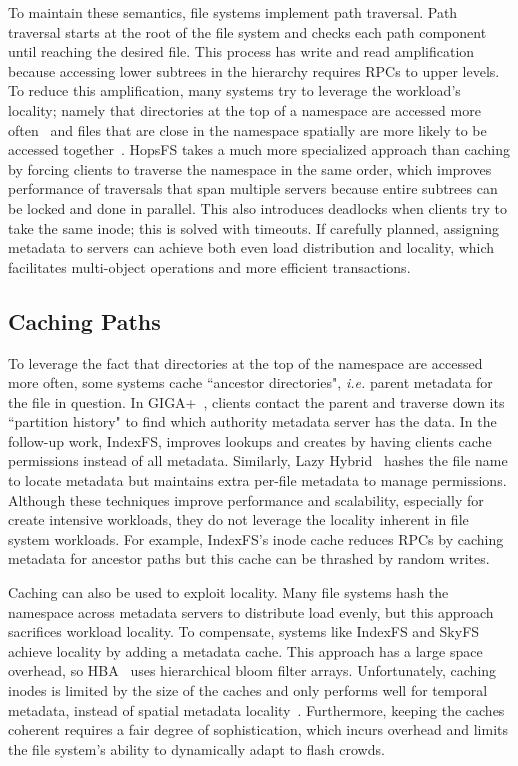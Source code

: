 To maintain these semantics, file systems implement path traversal. Path
traversal starts at the root of the file system and checks each path component
until reaching the desired file. This process has write and read amplification
because accessing lower subtrees in the hierarchy requires RPCs to upper
levels. To reduce this amplification, many systems try to leverage the
workload's locality; namely that directories at the top of a namespace are
accessed more often~\cite{ren:sc2014-indexfs} and files that are close in the
namespace spatially are more likely to be accessed
together~\cite{weil:osdi2006-ceph, weil:sc2004-dyn-metadata}.  HopsFS takes a
much more specialized approach than caching by forcing clients to traverse the
namespace in the same order, which improves performance of traversals that span
multiple servers because entire subtrees can be locked and done in parallel.
This also introduces deadlocks when clients try to take the same inode; this is
solved with timeouts.  If carefully planned, assigning metadata to servers can
achieve both even load distribution and locality, which facilitates
multi-object operations and more efficient transactions.

\subsection{Caching Paths}

To leverage the fact that directories at the top of the namespace are accessed
more often, some systems cache ``ancestor directories", {\it i.e.} parent
metadata for the file in question.  In GIGA+~\cite{patil:fast2011-giga+},
clients contact the parent and traverse down its ``partition history" to find
which authority metadata server has the data.  In the follow-up work, IndexFS,
improves lookups and creates by having clients cache permissions instead of all
metadata.  Similarly, Lazy Hybrid~\cite{brandt:msst2003-lh} hashes the file
name to locate metadata but maintains extra per-file metadata to manage
permissions.  Although these techniques improve performance and scalability,
especially for create intensive workloads, they do not leverage the locality
inherent in file system workloads.  For example, IndexFS's inode cache reduces
RPCs by caching metadata for ancestor paths but this cache can be thrashed by
random writes.

Caching can also be used to exploit locality.  Many file systems hash the
namespace across metadata servers to distribute load evenly, but this approach
sacrifices workload locality. To compensate, systems like IndexFS and
SkyFS~\cite{xing:sc2009-skyfs} achieve locality by adding a metadata cache.
This approach has a large space overhead, so HBA~\cite{zhu:pds2008-hba} uses
hierarchical bloom filter arrays. Unfortunately, caching inodes is limited by
the size of the caches and only performs well for temporal metadata, instead of
spatial metadata locality~\cite{weil:sc2004-dyn-metadata, sevilla:sc15-mantle,
li:msst2006-dynamic}.  Furthermore, keeping the caches coherent requires a fair
degree of sophistication, which incurs overhead and limits the file system's
ability to dynamically adapt to flash crowds.

